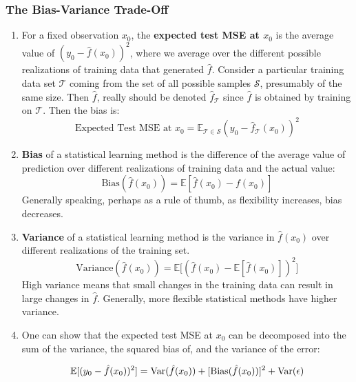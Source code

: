 \documentclass[10pt]{article}
\newcommand{\fhat}{\hat{f}}
\newcommand{\EE}{{\mathbb{E}}}
\newcommand{\Var}{{\rm Var}}
\newcommand{\Bias}{{\rm Bias}}
\begin{document}
\vspace{.2in} 
\subsubsection{The Bias-Variance Trade-Off} 
\begin{enumerate}
	\item For a fixed observation $x_0$, the \textbf{expected test MSE at $x_0$} is the average value of $(y_0 - \fhat(x_0))^2$, where we average over the different possible realizations of training data that generated $\fhat$.  {\color{brown} Consider a particular training data set $\mathcal{T}$ coming from the set of all possible samples $\mathcal{S}$, presumably of the same size.  Then $\fhat$, really should be denoted $\fhat_{\mathcal{T}}$ since $\fhat$ is obtained by training on $\mathcal{T}$. Then the bias is:
	$$\text{Expected Test MSE at $x_0$} = \EE_{\mathcal{T} \in \mathcal{S}} ( y_0 - \fhat_{\mathcal{T}}(x_0) )^2 $$}
	\item \textbf{Bias} of a statistical learning method is the difference of the average value of prediction over different realizations of training data and the actual value:
	$$\text{Bias}(\fhat(x_0)) = \EE[\fhat(x_0) - f(x_0) ]  $$
	Generally speaking, perhaps as a rule of thumb, as flexibility increases, bias decreases.
	\item \textbf{Variance} of a statistical learning method is the variance in $\fhat(x_0)$ over different realizations of the training set.  
	$$\text{Variance}(\fhat(x_0)) = \EE\Big[ (\fhat(x_0) - \EE[\fhat(x_0)])^2  \Big]$$
	High variance means that small changes in the training data can result in large changes in $\fhat$.  Generally, more flexible statistical methods have higher variance.
	\item One can show that the expected test MSE at $x_0$ can be decomposed into the sum of the variance, the squared bias of, and the variance of the error:
	
	$$\EE[ ( y_0 - \fhat(x_0))^2] = \Var(\fhat(x_0)) + [\Bias(\fhat(x_0))]^2 + \Var(\epsilon) $$
	

\end{enumerate}
\end{document}
